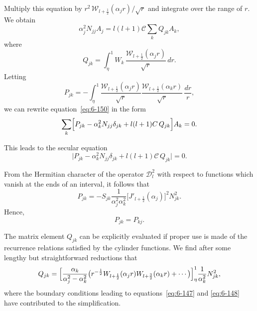 Multiply this equation by $r^2\,\mathscr{W}_{l+\frac{1}{2}}(\alpha_j r)/\sqrt{r}$ and integrate over the range of $r$.
We obtain
\begin{equation}\label{eq:6-150}
\alpha_j^2 N_{jj} A_j = l(l+1)\mathcal{C}\sum_k Q_{jk} A_k,
\end{equation}
where
\begin{equation}\label{eq:6-151}
Q_{jk} = \int_\eta^1 W_k\,\frac{\mathscr{W}_{l+\frac{1}{2}}(\alpha_j r)}{\sqrt{r}}\,dr.
\end{equation}
Letting
\begin{equation}\label{eq:6-152}
P_{jk} = -\int_\eta^1\frac{\mathscr{W}_{l+\frac{1}{2}}(\alpha_j r)}{\sqrt{r}}\frac{\mathscr{W}_{l+\frac{1}{2}}(\alpha_k r)}{\sqrt{r}}\,\frac{dr}{r},
\end{equation}
we can rewrite equation~\eqref{eq:6-150} in the form
\begin{equation}\label{eq:6-153}
\sum_k\Bigl[P_{jk}-\alpha_k^2 N_{jj}\delta_{jk}+l(l+1)\mathcal{C}\,Q_{jk}\Bigr]A_k = 0.
\end{equation}

This leads to the secular equation
\begin{equation}\label{eq:6-154}
\bigl|P_{jk}-\alpha_k^2 N_{jj}\delta_{jk}+l(l+1)\mathcal{C}\,Q_{jk}\bigr| = 0.
\end{equation}

From the Hermitian character of the operator $\mathscr{D}_l^2$ with respect to
functions which vanish at the ends of an interval, it follows that
\begin{equation}\label{eq:6-155}
P_{jk} = -S_{jk}\frac{1}{\alpha_j^2\alpha_k^2}\bigl[J'_{l+\frac{1}{2}}(\alpha_j)\bigr]^2N_{jk}^2.
\end{equation}
Hence,
\begin{equation}\label{eq:6-156}
P_{jk} = P_{kj}.
\end{equation}

The matrix element $Q_{jk}$ can be explicitly evaluated if proper use is
made of the recurrence relations satisfied by the cylinder functions. We
find after some lengthy but straightforward reductions that
\begin{equation}\label{eq:6-157}
Q_{jk} = \Bigl[\frac{\alpha_k}{\alpha_j^2-\alpha_k^2}\bigl(r^{-\frac{1}{2}}\mathscr{W}_{l+\frac{1}{2}}(\alpha_j r)\mathscr{W}_{l+\frac{3}{2}}(\alpha_k r) + \cdots\bigr)\Bigr]_\eta^1\frac{1}{\alpha_k^2} N_{jk}^2,
\end{equation}
where the boundary conditions leading to equations~\eqref{eq:6-147} and \eqref{eq:6-148} have
contributed to the simplification.

